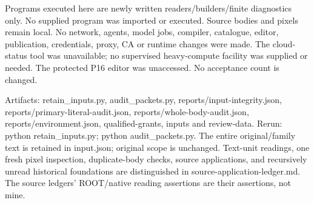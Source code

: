 \documentclass[11pt]{article}
\begin{document}
\begin{OwnProofBody}
Programs executed here are newly written readers/builders/finite diagnostics only. No supplied program was imported or executed. Source bodies and pixels remain local. No network, agents, model jobs, compiler, catalogue, editor, publication, credentials, proxy, CA or runtime changes were made. The cloud-status tool was unavailable; no supervised heavy-compute facility was supplied or needed. The protected P16 editor was unaccessed. No acceptance count is changed.

Artifacts: retain_inputs.py, audit_packets.py, reports/input-integrity.json, reports/primary-literal-audit.json, reports/whole-body-audit.json, reports/environment.json, qualified-grants, inputs and review-data. Rerun: python retain_inputs.py; python audit_packets.py. The entire original/family text is retained in input.json; original scope is unchanged. Text-unit readings, one fresh pixel inspection, duplicate-body checks, source applications, and recursively unread historical foundations are distinguished in source-application-ledger.md. The source ledgers' ROOT/native reading assertions are their assertions, not mine.

\end{OwnProofBody}
\end{document}
